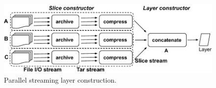 

\begin{figure}[t]
	\centering
	\centering
	\includegraphics[width=\columnwidth]{graphs/sift-layer-construct-new.pdf}
	\caption{Parallel streaming layer construction.}
	\label{fig:construct}
\end{figure}

